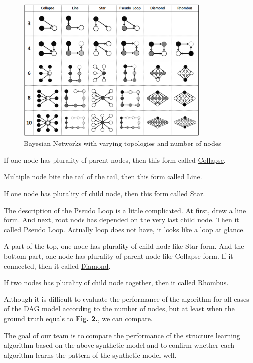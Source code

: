 \documentclass[runningheads,a4paper]{llncs}
\begin{document}
\begin{figure}[!h]
	\centering
	\includegraphics[height=200pt]{images/Topologies}
	\caption{\footnotesize{Bayesian Networks with varying topologies and number of nodes}}
\end{figure}	

If one node has plurality of parent nodes, then this form called \underline{Collapse}.

Multiple node bite the tail of the tail, then this form called \underline{Line}.

If one node has plurality of child node, then this form called \underline{Star}.

The description of the \underline{Pseudo Loop} is a little complicated. At first, drew a line form. And next, root node has depended on the very last child node. Then it called \underline{Pseudo Loop}. Actually loop does not have, it looks like a loop at glance.

A part of the top, one node has plurality of child node like Star form. And the bottom part, one node has plurality of parent node like Collapse form. If it connected, then it called \underline{Diamond}.

If two nodes has plurality of child node together, then it called \underline{Rhombus}.

Although it is difficult to evaluate the performance of the algorithm for all cases of the DAG model according to the number of nodes, but at least when the ground truth equals to \textbf{Fig. 2.}, we can compare.

The goal of our team is to compare the performance of the structure learning algorithm based on the above synthetic model and to confirm whether each algorithm learns the pattern of the synthetic model well.
\end{document}
